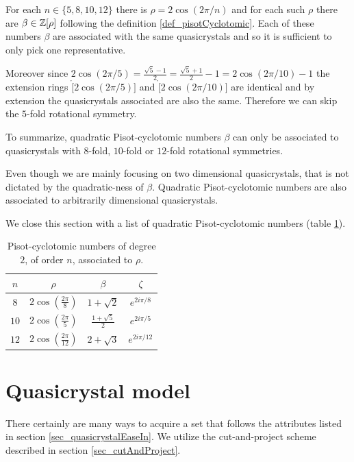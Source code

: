 \documentclass[text.tex]{subfiles}
\begin{document}
For each $n\in\{5,8,10,12\}$ there is $\rho = 2\cos\left(2\pi/n\right)$ and for each such $\rho$ there are $\beta \in \mathbb{Z}[\rho]$ following the definition \ref{def_pisotCyclotomic}. Each of these numbers $\beta$ are associated with the same quasicrystals and so it is sufficient to only pick one representative. 

Moreover since $2\cos\left(2\pi/5\right) = \frac{\sqrt{5}-1}{2} = \frac{\sqrt{5}+1}{2} -1 = 2\cos\left(2\pi/10\right) - 1$ the extension rings $\ring[2\cos\left(2\pi/5\right)]$ and $\ring[2\cos\left(2\pi/10\right)]$ are identical and by extension the quasicrystals associated are also the same. Therefore we can skip the $5$-fold rotational symmetry. 

To summarize, quadratic Pisot-cyclotomic numbers $\beta$ can only be associated to quasicrystals with $8$-fold, $10$-fold or $12$-fold rotational symmetries. 

Even though we are mainly focusing on two dimensional quasicrystals, that is not dictated by the quadratic-ness of $\beta$. Quadratic Pisot-cyclotomic numbers are also associated to arbitrarily dimensional quasicrystals. 

We close this section with a list of quadratic Pisot-cyclotomic numbers (table \ref{tab_quadraticPisotCyclotomic}). 

\begin{table}[h!]
\centering
\begin{tabular}{cccc}
$n$ & $\rho$ & $\beta$ & $\zeta$ \\
\hline
$8$   & $2 \cos\left(\frac{2\pi}{8}\right)$   & $ 1+\sqrt{2} $            & $e^{2i\pi/8}$ \\
$10$   & $2 \cos\left(\frac{2\pi}{5}\right)$   & $\frac{1+\sqrt{5}}{2} $   & $e^{2i\pi/5}$ \\
$12$  & $2 \cos\left(\frac{2\pi}{12}\right)$  & $ 2+\sqrt{3} $            & $e^{2i\pi/12}$ \\
\end{tabular}
\caption{Pisot-cyclotomic numbers of degree $2$, of order $n$, associated to $\rho$.}
\label{tab_quadraticPisotCyclotomic}
\end{table}

\section{Quasicrystal model}%
There certainly are many ways to acquire a set that follows the attributes listed in section \ref{sec_quasicrystalEaseIn}. We utilize the cut-and-project scheme described in section \ref{sec_cutAndProject}. 
\end{document}
